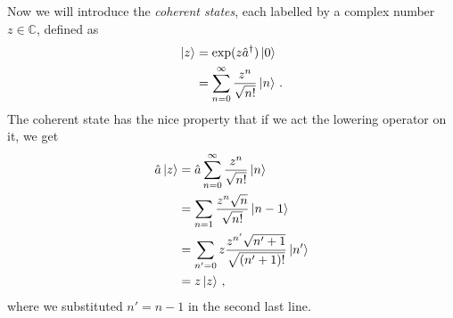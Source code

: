 \documentclass{article}
\theoremstyle{plain}\theoremheaderfont{\normalfont\itshape}\theorembodyfont{\rmfamily}\theoremseparator{.}\newtheorem*{rem}{Remark}\newtheorem*{ex}{Example}\newtheorem*{proof}{Proof}\newtheorem*{altp}{Alternative proof}
\theoremstyle{plain}\theoremheaderfont{\normalfont\bfseries}\theorembodyfont{\rmfamily}\theoremseparator{.}\newtheorem{thm}{Theorem}[section]\newtheorem{lem}[thm]{Lemma}\newtheorem{prop}[thm]{Proposition}\newtheorem*{cor}{Corollary}\newtheorem{defn}[thm]{Definition}\newtheorem{clm}[thm]{Claim}\newtheorem{clminproof}{Claim}
\theoremstyle{break}\theoremheaderfont{\normalfont\itshape}\theorembodyfont{\rmfamily}\theoremseparator{.\medskip}\newtheorem*{proofskip}{Proof}\newtheorem*{exs}{Examples}\newtheorem*{rems}{Remarks}
\theoremstyle{break}\theoremheaderfont{\normalfont\bfseries}\theorembodyfont{\rmfamily}\theoremseparator{.\medskip}\newtheorem{lemskip}[thm]{Lemma}\newtheorem{defnskip}[thm]{Definition}\newtheorem{propskip}[thm]{Proposition}\newtheorem{thmskip}[thm]{Theorem}
\numberwithin{equation}{section}
\newcommand{\ket}[1]{\left| #1 \right\rangle}
\newcommand{\CC}{\mathbb{C}}
\newcommand{\rai}{\hat{a}^\dagger}
\newcommand{\low}{\hat{a}}
\begin{document}
    Now we will introduce the \textit{coherent states}, each labelled by a complex number \(z\in\CC\), defined as
    \begin{align}
        \ket{z}&=\exp(z\rai)\ket{0}\notag \\
        &=\sum_{n=0}^{\infty}\frac{z^n}{\sqrt{n!}}\ket{n}\,.
    \end{align}
    The coherent state has the nice property that if we act the lowering operator on it, we get
    \begin{align}
        \low\ket{z}&=\low\sum_{n=0}^{\infty}\frac{z^n}{\sqrt{n!}}\ket{n} \notag\\
        &=\sum_{n=1}\frac{z^n\sqrt{n}}{\sqrt{n!}}\ket{n-1}\notag \\
        &=\sum_{n'=0}z\frac{z^{n'}\sqrt{n'+1}}{\sqrt{(n'+1)!}}\ket{n'}\notag \\
        &=z\ket{z}\,,\label{lower_coherent_state}
    \end{align}
    where we substituted \(n'=n-1\) in the second last line.
\end{document}
